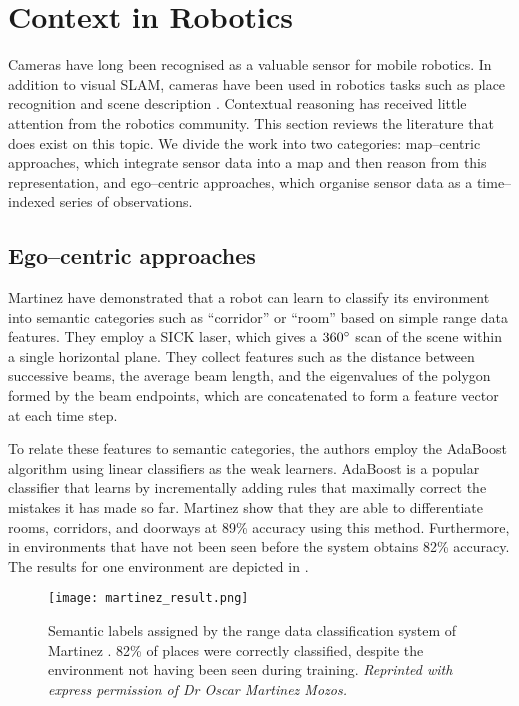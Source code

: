 \section{Context in Robotics}
Cameras have long been recognised as a valuable sensor for mobile
robotics. In addition to visual SLAM, cameras have been used in
robotics tasks such as place recognition \cite{Cummins08} and scene
description \cite{Posner08}. Contextual reasoning has received little
attention from the robotics community. This section reviews the
literature that does exist on this topic. We divide the work into two
categories: map--centric approaches, which integrate sensor data into
a map and then reason from this representation, and ego--centric
approaches, which organise sensor data as a time--indexed series of
observations.

\subsection{Ego--centric approaches}
Martinez \etal \cite{Mozos05} have demonstrated that a robot can learn
to classify its environment into semantic categories such as
``corridor'' or ``room'' based on simple range data features. They
employ a SICK laser, which gives a $360\degrees$ scan of the scene
within a single horizontal plane. They collect features such as the
distance between successive beams, the average beam length, and the
eigenvalues of the polygon formed by the beam endpoints, which are
concatenated to form a feature vector at each time step.

To relate these features to semantic categories, the authors employ
the AdaBoost algorithm \cite{Schapire98} using linear classifiers as
the weak learners. AdaBoost is a popular classifier that learns by
incrementally adding rules that maximally correct the mistakes it has
made so far. Martinez \etal show that they are able to differentiate
rooms, corridors, and doorways at 89\% accuracy using this
method. Furthermore, in environments that have not been seen before
the system obtains 82\% accuracy. The results for one environment are
depicted in .

\begin{figure}[tb]
  \centering
  \texttt{[image: martinez\_result.png]}
  \caption{Semantic labels assigned by the range data classification
    system of Martinez \etal \cite{Mozos05}. 82\% of places were
    correctly classified, despite the environment not having been seen
    during training.
    \textit{Reprinted with express permission of Dr Oscar Martinez Mozos.}
    }
  \label{fig:martinez-result}
\end{figure}

